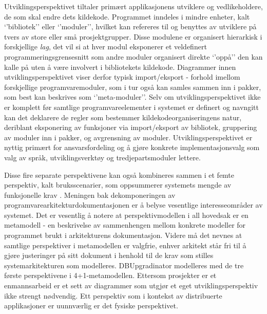 Utviklingsperspektivet tiltaler primært applikasjonens utviklere og vedlikeholdere, de som skal endre dets kildekode. Programmet inndeles i mindre enheter, kalt ‘’bibliotek’’ eller ‘’moduler’’, hvilket kan refereres til og benyttes av utviklere på tvers av store eller små prosjektgrupper. Disse modulene er organisert hierarkisk i forskjellige \emph{lag}, det vil si at hver modul eksponerer et veldefinert programmeringsgrensesnitt som andre moduler organisert direkte ‘’oppå’’ den kan kalle på uten å være involvert i bibliotekets kildekode. Diagrammer innen utviklingsperspektivet viser derfor typisk import/eksport - forhold imellom forskjellige programvaremoduler, som i tur også kan samles sammen inn i pakker, som best kan beskrives som ‘’meta-moduler’’. Selv om utviklingsperspektivet ikke er komplett før samtlige programvareelementer i systemet er definert og navngitt kan det deklarere de regler som bestemmer kildekodeorganiseringens natur, deriblant eksponering av funksjoner via import/eksport av bibliotek, gruppering av moduler inn i pakker, og avgrensning av moduler. Utviklingsperspektivet er nyttig primært for ansvarsfordeling og å gjøre konkrete implementasjonsvalg som valg av språk, utviklingsverktøy og tredjepartsmoduler lettere.

Disse fire separate perspektivene kan også kombineres sammen i et femte perspektiv, kalt bruksscenarier, som oppsummerer systemets mengde av funksjonelle krav \citep{kruchten1995}. Meningen bak dekomponeringen av programvarearkitekturdokumentasjonen er å belyse vesentlige interesseområder av systemet. Det er vesentlig å notere at perspektivmodellen i all hovedsak er en metamodell - en beskrivelse av sammenhengen mellom konkrete modeller for programmet brukt i arkitekturens dokumentasjon. Videre må det nevnes at samtlige perspektiver i metamodellen er valgfrie, enhver arkitekt står fri til å gjøre justeringer på sitt dokument i henhold til de krav som stilles systemarkitekturen som modelleres. DBUpgradinator modelleres med de tre første perspektivene i 4+1-metamodellen. Ettersom prosjekter er et enmannsarbeid er et sett av diagrammer som utgjør et eget utviklingsperspektiv ikke strengt nødvendig. Ett perspektiv som i kontekst av distribuerte applikasjoner er uunnværlig er det fysiske perspektivet.

\newpage

